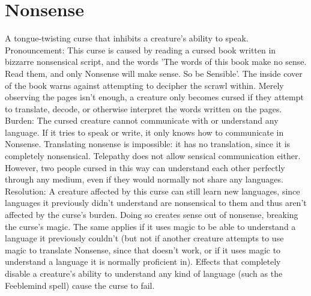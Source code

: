 \documentclass[10pt,a4paper,twoside,twocolumn,openany,bg=print,nodeprecatedcode]{dndbook}
\begin{document}
\section{Nonsense}
A tongue-twisting curse that inhibits a creature's ability to speak.
Pronouncement: This curse is caused by reading a cursed book written in bizzarre nonsensical script, and the words 'The words of this book make no sense. Read them, and only Nonsense will make sense. So be Sensible'.
The inside cover of the book warns against attempting to decipher the scrawl within. Merely observing the pages isn't enough, a creature only becomes cursed if they attempt to translate, decode, or otherwise interpret the words written on the pages.
Burden: The cursed creature cannot communicate with or understand any language. If it tries to speak or write, it only knows how to communicate in Nonsense. Translating nonsense is impossible: it has no translation, since it is completely nonsensical. Telepathy does not allow sensical communication either. However, two people cursed in this way can understand each other perfectly through any medium, even if they would normally not share any languages.
Resolution: A creature affected by this curse can still learn new languages, since languages it previously didn't understand are nonsensical to them and thus aren't affected by the curse's burden. Doing so creates sense out of nonsense, breaking the curse's magic. The same applies if it uses magic to be able to understand a language it previously couldn't (but not if another creature attempts to use magic to translate Nonsense, since that doesn't work, or if it uses magic to understand a language it is normally proficient in). Effects that completely disable a creature's ability to understand any kind of language (such as the Feeblemind spell) cause the curse to fail.
\end{document}
